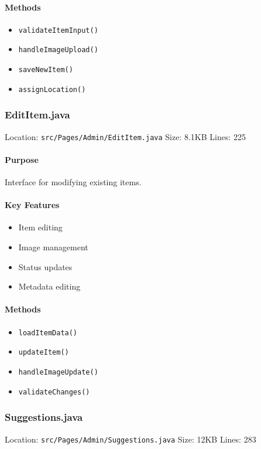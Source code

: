 \documentclass[12pt,a4paper]{article}
\begin{document}
\paragraph{Methods}
\begin{itemize}
    \item \texttt{validateItemInput()}
    \item \texttt{handleImageUpload()}
    \item \texttt{saveNewItem()}
    \item \texttt{assignLocation()}
\end{itemize}

\subsubsection{EditItem.java}
Location: \texttt{src/Pages/Admin/EditItem.java}
Size: 8.1KB
Lines: 225

\paragraph{Purpose}
Interface for modifying existing items.

\paragraph{Key Features}
\begin{itemize}
    \item Item editing
    \item Image management
    \item Status updates
    \item Metadata editing
\end{itemize}

\paragraph{Methods}
\begin{itemize}
    \item \texttt{loadItemData()}
    \item \texttt{updateItem()}
    \item \texttt{handleImageUpdate()}
    \item \texttt{validateChanges()}
\end{itemize}

\subsubsection{Suggestions.java}
Location: \texttt{src/Pages/Admin/Suggestions.java}
Size: 12KB
Lines: 283
\end{document}
